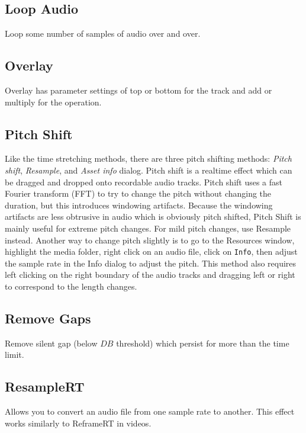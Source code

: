 \subsection{Loop Audio}%
\label{sub:loop_audio}

Loop some number of samples of audio over and over.

\subsection{Overlay}%
\label{sub:overlay}

Overlay has parameter settings of top or bottom for the track and add or multiply for the operation.

\subsection{Pitch Shift}%
\label{sub:pitch_shift}

Like the time stretching methods, there are three pitch shifting methods: \textit{Pitch shift}, \textit{Resample}, and \textit{Asset info} dialog. Pitch shift is a realtime effect which can be dragged and dropped onto recordable audio tracks. Pitch shift uses a fast Fourier transform (FFT) to try to change the pitch without changing the duration, but this introduces windowing artifacts. Because the windowing artifacts are less obtrusive in audio which is obviously pitch shifted, Pitch Shift is mainly useful for extreme pitch changes. For mild pitch changes, use Resample instead. Another way to change pitch slightly is to go to the Resources window, highlight the media folder, right click on an audio file, click on \texttt{Info}, then adjust the sample rate in the Info dialog to adjust the pitch. This method also requires left clicking on the right boundary of the audio tracks and dragging left or right to correspond to the length changes.

\subsection{Remove Gaps}%
\label{sub:remove_gaps}

Remove silent gap (below $DB$ threshold) which persist for more than the time limit.

\subsection{ResampleRT}%
\label{sub:resamplert}

Allows you to convert an audio file from one sample rate to another. This effect works similarly to ReframeRT in videos.


